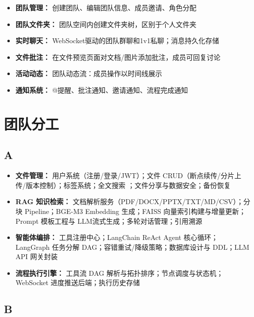 \documentclass[a4paper,zihao=-4]{ctexart}
\begin{document}
\begin{itemize}
  \item \textbf{团队管理：} 创建团队、编辑团队信息、成员邀请、角色分配
  \item \textbf{团队文件夹：} 团队空间内创建文件夹树，区别于个人文件夹
  \item \textbf{实时聊天：} WebSocket驱动的团队群聊和1v1私聊；消息持久化存储
  \item \textbf{文件批注：} 在文件预览页面对文档/图片添加批注，成员可回复讨论
  \item \textbf{活动动态：} 团队动态流：成员操作以时间线展示
  \item \textbf{通知系统：} @提醒、批注通知、邀请通知、流程完成通知
\end{itemize}

\section{团队分工}

\subsection{A}

\begin{itemize}
  \item \textbf{文件管理：} 用户系统（注册/登录/JWT）；文件
        CRUD（断点续传/分片上传/版本控制）；标签系统；全文搜索
        ；文件分享与数据安全；备份恢复
  \item \textbf{RAG 知识检索：} 文档解析服务（PDF/DOCX/PPTX/TXT/MD/CSV）；分块
        Pipeline；BGE-M3
        Embedding 生成；FAISS 向量索引构建与增量更新；Prompt
        模板工程与 LLM流式生成；多轮对话管理；引用溯源
  \item \textbf{智能体编排：} 工具注册中心；LangChain ReAct Agent 核心循环；LangGraph 任务分解
        DAG；容错重试/降级策略；数据库设计与 DDL；LLM API 网关封装
  \item \textbf{流程执行引擎：} 工具流 DAG 解析与拓扑排序；节点调度与状态机；WebSocket 进度推送后端；执行历史存储
\end{itemize}

\subsection{B}
\end{document}
